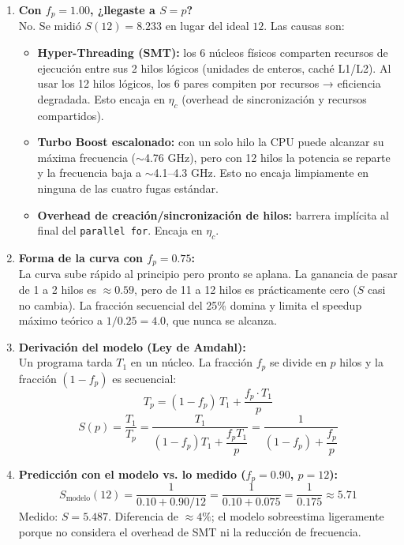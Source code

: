 \documentclass[12pt,letterpaper]{article}
\begin{document}
\begin{enumerate}

\item \textbf{Con $f_p = 1.00$, ¿llegaste a $S = p$?}\\
No. Se midió $S(12) = 8.233$ en lugar del ideal $12$. Las causas son:
\begin{itemize}
  \item \textbf{Hyper-Threading (SMT):} los 6 núcleos físicos comparten recursos de ejecución entre sus 2 hilos lógicos (unidades de enteros, caché L1/L2). Al usar los 12 hilos lógicos, los 6 pares compiten por recursos → eficiencia degradada. Esto encaja en $\eta_c$ (overhead de sincronización y recursos compartidos).
  \item \textbf{Turbo Boost escalonado:} con un solo hilo la CPU puede alcanzar su máxima frecuencia ($\sim$4.76 GHz), pero con 12 hilos la potencia se reparte y la frecuencia baja a $\sim$4.1–4.3 GHz. Esto no encaja limpiamente en ninguna de las cuatro fugas estándar.
  \item \textbf{Overhead de creación/sincronización de hilos:} barrera implícita al final del \texttt{parallel for}. Encaja en $\eta_c$.
\end{itemize}

\item \textbf{Forma de la curva con $f_p = 0.75$:}\\
La curva sube rápido al principio pero pronto se aplana. La ganancia de pasar de 1 a 2 hilos es $\approx 0.59$, pero de 11 a 12 hilos es prácticamente cero ($S$ casi no cambia). La fracción secuencial del 25\% domina y limita el speedup máximo teórico a $1/0.25 = 4.0$, que nunca se alcanza.

\item \textbf{Derivación del modelo (Ley de Amdahl):}\\
Un programa tarda $T_1$ en un núcleo. La fracción $f_p$ se divide en $p$ hilos y la fracción $(1-f_p)$ es secuencial:
\[
T_p = (1 - f_p)\,T_1 + \frac{f_p \cdot T_1}{p}
\]
\[
S(p) = \frac{T_1}{T_p} = \frac{T_1}{(1-f_p)T_1 + \dfrac{f_p T_1}{p}} = \frac{1}{(1-f_p) + \dfrac{f_p}{p}}
\]

\item \textbf{Predicción con el modelo vs. lo medido ($f_p = 0.90$, $p = 12$):}\\
\[
S_{\text{modelo}}(12) = \frac{1}{0.10 + 0.90/12} = \frac{1}{0.10 + 0.075} = \frac{1}{0.175} \approx 5.71
\]
Medido: $S = 5.487$. Diferencia de $\approx 4\%$; el modelo sobreestima ligeramente porque no considera el overhead de SMT ni la reducción de frecuencia.


\end{enumerate}
\end{document}
